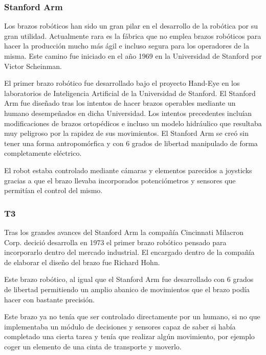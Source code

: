 \subsubsection{Stanford Arm}

Los brazos robóticos han sido un gran pilar en el desarrollo de la robótica por su gran utilidad. Actualmente rara es la fábrica que no emplea brazos robóticos para hacer la producción mucho más ágil e incluso segura para los operadores de la misma. Este camino fue iniciado en el año 1969 en la Universidad de Stanford por Victor Scheinman.

\vspace{10px}

El primer brazo robótico fue desarrollado bajo el proyecto Hand-Eye en los laboratorios de Inteligencia Artificial de la Universidad de Stanford. El Stanford Arm fue diseñado tras los intentos de hacer brazos operables mediante un humano desempeñados en dicha Universidad. Los intentos precedentes incluían modificaciones de brazos ortopédicos e incluso un modelo hidráulico que resultaba muy peligroso por la rapidez de sus movimientos. El Stanford Arm se creó sin tener una forma antropomórfica y con 6 grados de libertad manipulado de forma completamente eléctrico.

\vspace{10px}

El robot estaba controlado mediante cámaras y elementos parecidos a joysticks gracias a que el brazo llevaba incorporados potenciómetros y sensores que permitían el control del mismo.

\subsubsection{T3}

Tras los grandes avances del Stanford Arm la compañía Cincinnati Milacron Corp. decició desarrolla en 1973 el primer brazo robótico pensado para incorporarlo dentro del mercado industrial. El encargado dentro de la compañía de elaborar el diseño del brazo fue Richard Hohn.

\vspace{10px}

Este brazo robótico, al igual que el Stanford Arm fue desarrollado con 6 grados de libertad permitiendo un amplio abanico de movimientos que el brazo podía hacer con bastante precisión.

\vspace{10px}

Este brazo ya no tenía que ser controlado directamente por un humano, si no que implementaba un módulo de decisiones y sensores capaz de saber si había completado una cierta tarea y tenía que realizar algún movimiento, por ejemplo coger un elemento de una cinta de transporte y moverlo.
